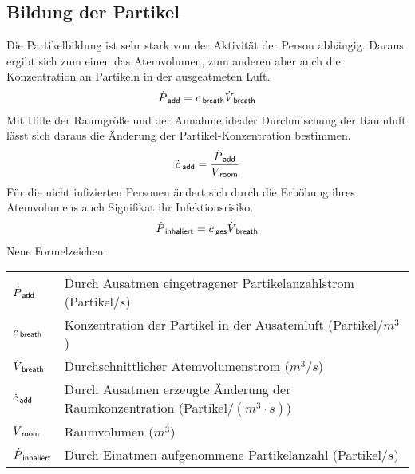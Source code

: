 \documentclass[12pt,a4paper,bibtotocnumbered,liststotocnumbered]{scrreprt}
\newenvironment{parameterNames}{Neue Formelzeichen:\\ \begin{tabular}{ll}}{\end{tabular} \\ \\}
\begin{document}
\subsection{Bildung der Partikel}
Die Partikelbildung ist sehr stark von der Aktivität der Person abhängig. Daraus ergibt sich zum einen das Atemvolumen, zum anderen aber auch die Konzentration an Partikeln in der ausgeatmeten Luft.
\begin{align}
\dot{P}_{\: \mathsf{add}} = c_{\: \mathsf{breath}}\dot{V}_{\: \mathsf{breath}}
\end{align}
Mit Hilfe der Raumgröße und der Annahme idealer Durchmischung der Raumluft lässt sich daraus die Änderung der Partikel-Konzentration bestimmen.
\begin{align}
\dot{c}_{\: \mathsf{add}} =\frac{\dot{P}_{\: \mathsf{add}}}{V_{\: \mathsf{room}}}
\end{align}
Für die nicht infizierten Personen ändert sich durch die Erhöhung ihres Atemvolumens auch Signifikat ihr Infektionsrisiko.
\begin{align}
\dot{P}_{\: \mathsf{inhaliert}} = c_{\: \mathsf{ges}}\dot{V}_{\: \mathsf{breath}}
\end{align}
\begin{parameterNames}
$\dot{P}_{\: \mathsf{add}}$ & Durch Ausatmen eingetragener Partikelanzahlstrom (Partikel$/s$)\\
$c_{\: \mathsf{breath}}$ & Konzentration der Partikel in der Ausatemluft (Partikel$/m^3$)\\
$\dot{V}_{\: \mathsf{breath}}$ & Durchschnittlicher Atemvolumenstrom ($m^3/s$)\\
$\dot{c}_{\: \mathsf{add}}$ & Durch Ausatmen erzeugte Änderung der  Raumkonzentration (Partikel$/(m^3\cdot s)$)\\
$V_{\: \mathsf{room}}$ & Raumvolumen ($m^3$)\\
$\dot{P}_{\: \mathsf{inhaliert}}$ & Durch Einatmen aufgenommene Partikelanzahl (Partikel$/s$)\\
\end{parameterNames}
\end{document}
